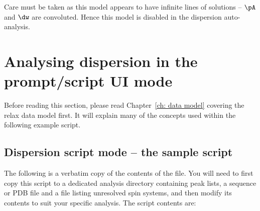 Care must be taken as this model appears to have infinite lines of solutions -- $\pA$ and $\dw$ are convoluted.  Hence this model is disabled in the dispersion auto-analysis.



\section{Analysing dispersion in the prompt/script UI mode}

Before reading this section, please read Chapter~\ref{ch: data model} covering the relax data model first.  It will explain many of the concepts used within the following example script.



\subsection{Dispersion script mode -- the sample script}

The following is a verbatim copy of the contents of the  file.
You will need to first copy this script to a dedicated analysis directory containing peak lists, a sequence or PDB file and a file listing unresolved spin systems, and then modify its contents to suit your specific analysis.
The script contents are:

